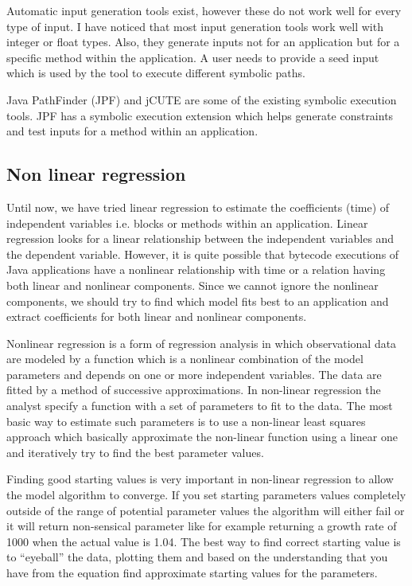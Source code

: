 \documentclass[11pt]{article}
\begin{document}
Automatic input generation tools exist, however these do not work well for every type of input. I have noticed that most input generation tools work well with integer or float types. Also, they generate inputs not for an application but for a specific method within the application. A user needs to provide a seed input which is used by the tool to execute different symbolic paths. 

Java PathFinder (JPF) and jCUTE are some of the existing symbolic execution tools. JPF has a symbolic execution extension which helps generate constraints and test inputs for a method within an application.\citep{jpftut}

\subsection{Non linear regression}
Until now, we have tried linear regression to estimate the coefficients (time) of independent variables i.e. blocks or methods within an application. Linear regression looks for a linear relationship between the independent variables and the dependent variable. However, it is quite possible that bytecode executions of Java applications have a nonlinear relationship with time or a relation having both linear and nonlinear components. Since we cannot ignore the nonlinear components, we should try to find which model fits best to an application and extract coefficients for both linear and nonlinear components.

Nonlinear regression is a form of regression analysis in which observational data are modeled by a function which is a nonlinear combination of the model parameters and depends on one or more independent variables. The data are fitted by a method of successive approximations. In non-linear regression the analyst specify a function with a set of parameters to fit to the data. The most basic way to estimate such parameters is to use a non-linear least squares approach which basically approximate the non-linear function using a linear one and iteratively try to find the best parameter values. \citep{nonlinearreg}

Finding good starting values is very important in non-linear regression to allow the model algorithm to converge. If you set starting parameters values completely outside of the range of potential parameter values the algorithm will either fail or it will return non-sensical parameter like for example returning a growth rate of 1000 when the actual value is 1.04. The best way to find correct starting value is to “eyeball” the data, plotting them and based on the understanding that you have from the equation find approximate starting values for the parameters. 
\end{document}
